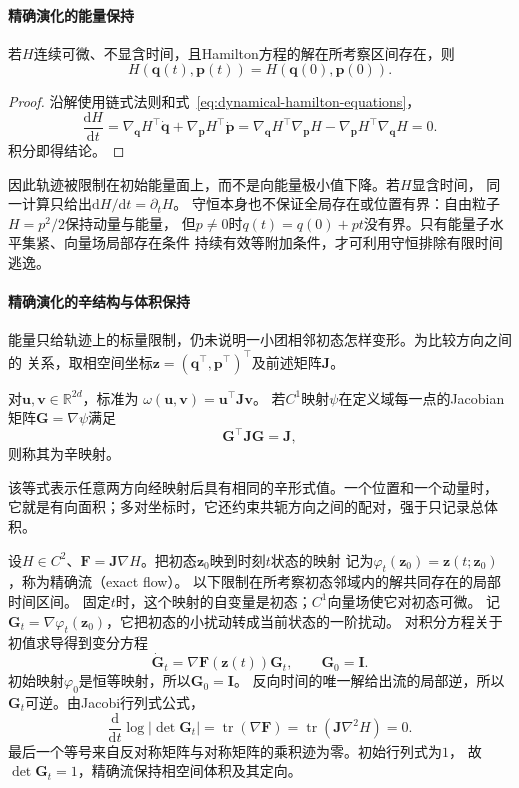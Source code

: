 \paragraph{精确演化的能量保持}
\begin{theorem}[Hamilton能量守恒]
  \label{thm:dynamical-hamiltonian-energy-conservation}
  若$H$连续可微、不显含时间，且Hamilton方程的解在所考察区间存在，则
  \[
    H(\bm q(t),\bm p(t))=H(\bm q(0),\bm p(0)).
  \]
\end{theorem}
\begin{proof}
  沿解使用链式法则和式~\eqref{eq:dynamical-hamilton-equations}，
  \[
    \frac{\mathrm dH}{\mathrm dt}
    =\nabla_{\bm q}H^\top\dot{\bm q}
      +\nabla_{\bm p}H^\top\dot{\bm p}
    =\nabla_{\bm q}H^\top\nabla_{\bm p}H
      -\nabla_{\bm p}H^\top\nabla_{\bm q}H=0.
  \]
  积分即得结论。
\end{proof}
因此轨迹被限制在初始能量面上，而不是向能量极小值下降。若$H$显含时间，
同一计算只给出$\mathrm dH/\mathrm dt=\partial_tH$。
守恒本身也不保证全局存在或位置有界：自由粒子$H=p^2/2$保持动量与能量，
但$p\neq0$时$q(t)=q(0)+pt$没有界。只有能量子水平集紧、向量场局部存在条件
持续有效等附加条件，才可利用守恒排除有限时间逃逸。

\paragraph{精确演化的辛结构与体积保持}
能量只给轨迹上的标量限制，仍未说明一小团相邻初态怎样变形。为比较方向之间的
关系，取相空间坐标$\bm z=(\bm q^\top,\bm p^\top)^\top$及前述矩阵$\bm J$。
\begin{definition}[标准辛形式与辛映射]
  \label{def:dynamical-symplectic-form-map}
  对$\bm u,\bm v\in\mathbb R^{2d}$，标准为
  $\omega(\bm u,\bm v)=\bm u^\top\bm J\bm v$。
  若$C^1$映射$\psi$在定义域每一点的Jacobian矩阵$\bm G=\nabla\psi$满足
  \begin{equation}
    \bm G^\top\bm J\bm G=\bm J,
    \label{eq:dynamical-symplectic-map}
  \end{equation}
  则称其为辛映射。
\end{definition}
该等式表示任意两方向经映射后具有相同的辛形式值。一个位置和一个动量时，
它就是有向面积；多对坐标时，它还约束共轭方向之间的配对，强于只记录总体积。

设$H\in C^2$、$\bm F=\bm J\nabla H$。把初态$\bm z_0$映到时刻$t$状态的映射
记为$\varphi_t(\bm z_0)=\bm z(t;\bm z_0)$，称为精确流（exact flow）。
以下限制在所考察初态邻域内的解共同存在的局部时间区间。
固定$t$时，这个映射的自变量是初态；$C^1$向量场使它对初态可微。
记$\bm G_t=\nabla\varphi_t(\bm z_0)$，它把初态的小扰动转成当前状态的一阶扰动。
对积分方程关于初值求导得到变分方程
\[
  \dot{\bm G}_t=\nabla\bm F(\bm z(t))\bm G_t,\qquad \bm G_0=\bm I.
\]
初始映射$\varphi_0$是恒等映射，所以$\bm G_0=\bm I$。
反向时间的唯一解给出流的局部逆，所以$\bm G_t$可逆。由Jacobi行列式公式，
\[
  \frac{\mathrm d}{\mathrm dt}\log|\det\bm G_t|
  =\operatorname{tr}(\nabla\bm F)
  =\operatorname{tr}(\bm J\nabla^2H)=0.
\]
最后一个等号来自反对称矩阵与对称矩阵的乘积迹为零。初始行列式为$1$，
故$\det\bm G_t=1$，精确流保持相空间体积及其定向。

